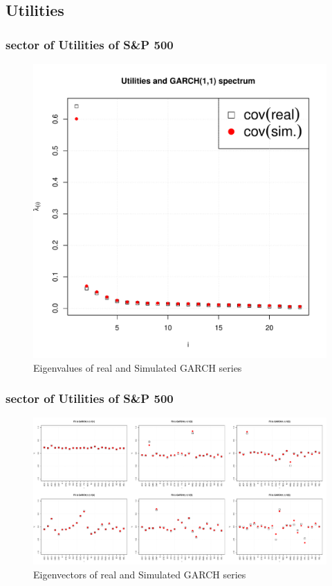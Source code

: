 \documentclass{beamer}
\begin{document}
\subsection{Utilities}
\begin{frame}
  \frametitle{sector of Utilities of S\&P 500}
  \begin{figure}[htb!]
    \centering
    \includegraphics[scale=0.35]{Utilities_eigenvalues.pdf}
    \caption{\scriptsize Eigenvalues of real and Simulated GARCH series}
  \end{figure}
\end{frame}

\begin{frame}
  \frametitle{sector of Utilities of S\&P 500}
  \begin{figure}[htb!]
    \centering
    \includegraphics[width=1.0\linewidth]{Utilities_eigenvectors1.pdf}
    \caption{\scriptsize Eigenvectors of real and Simulated GARCH series}
  \end{figure}
\end{frame}
\end{document}
